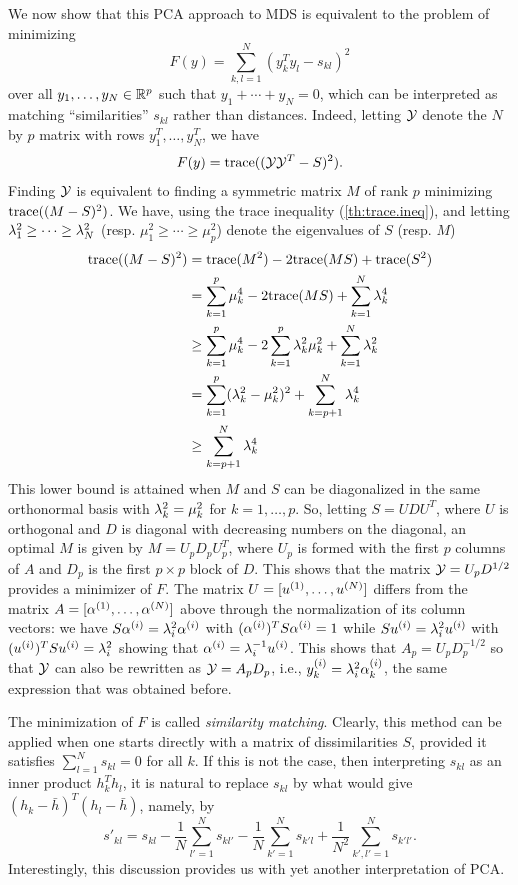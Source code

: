 We now show that this PCA approach to MDS is equivalent to the problem of minimizing
\begin{equation}
\label{eq:sim.match}
F(y) = \sum_{k,l=1}^N (y_k^Ty_l - s_{kl})^2 
\end{equation}
over all $y_1, \ldots, y_N\in {\mathbb{R}}^p$ such that $y_1 + \cdots + y_N = 0$, 
which can be interpreted as matching ``similarities'' $s_{kl}$ rather than distances. Indeed, letting ${\mathcal Y}$ denote the $N$ by $p$ matrix with rows $y_1^T, \ldots, y_N^T$, we have
\[
F(y) = {\mathrm{trace}}( ({\mathcal Y}{\mathcal Y}^T - S)^2).
\]
Finding ${\mathcal Y}$ is equivalent to finding a symmetric matrix $M$ of rank $p$ minimizing ${\mathrm{trace}}((M-S)^2)$.
 We have, using the trace inequality (\cref{th:trace.ineq}), and letting $\lambda_1^2 \geq \cdots \geq \lambda_N^2$  (resp. $\mu_1^2 \geq \cdots \geq \mu_p^2$) denote the eigenvalues of $S$ (resp. $M$)
\begin{align*}
{\mathrm{trace}}((M-S)^2) & = {\mathrm{trace}}(M^2) - 2{\mathrm{trace}}(MS) + {\mathrm{trace}}(S^2) \\
&= \sum_{k=1}^p \mu_k^4 - 2{\mathrm{trace}}(MS) + \sum_{k=1}^N \lambda_k^4\\
&\geq \sum_{k=1}^p \mu_k^4 - 2\sum_{k=1}^p \lambda^2_k\mu^2_k + \sum_{k=1}^N \lambda_k^2\\
&= \sum_{k=1}^p (\lambda^2_k-\mu^2_k)^2 + \sum_{k=p+1}^N \lambda_k^4\\
&\geq  \sum_{k=p+1}^N \lambda_k^4
\end{align*}
This lower bound is attained when $M$ and $S$ can be diagonalized in the same orthonormal basis with $\lambda^2_k=\mu^2_k$ for $k=1, \ldots, p$. So, letting $S = UDU^T$, where $U$ is orthogonal and $D$ is diagonal with decreasing numbers on the diagonal, an optimal $M$ is given by $M = U_p D_p U_p^T$, where $U_p$ is formed with the first $p$ columns of $A$ and $D_p$ is the first $p\times p$ block of $D$. This shows that the matrix ${\mathcal Y} = U_p D^{1/2}$ provides a minimizer of $F$.
The matrix $U = [u^{(1)}, \ldots, u^{(N)}]$ differs from the matrix $A = [\alpha^{(1)}, \ldots, \alpha^{(N)}]$ above through the normalization of its column vectors: we have $S\alpha^{(i)} = \lambda^2_i \alpha^{(i)}$ with $(\alpha^{(i)})^T S \alpha^{(i)} = 1$ while $Su^{(i)} = \lambda^2_i u^{(i)}$ with $(u^{(i)})^T S u^{(i)} = \lambda^2_i$ showing that $\alpha^{(i)} = \lambda_i^{-1} u^{(i)}$. This shows that $A_p = U_p D_p^{-1/2}$ so that ${\mathcal Y}$ can also be rewritten as ${\mathcal Y} = A_p D_p$, i.e., $y_{k}^{(i)} =  \lambda_i^2 \alpha_{k}^{(i)}$, the same expression that was obtained before.

The minimization of $F$ is called {\em similarity matching}. Clearly, this method can be applied when one starts directly with a matrix of dissimilarities $S$, provided it satisfies $\sum_{l=1}^N s_{kl}=0$ for all $k$. If this is not the case, then interpreting $s_{kl}$ as an inner product $h_k^Th_l$, it is natural to replace $s_{kl}$ by what would give $(h_k - \bar h)^T(h_l - \bar h)$, namely, by 
\[
s'_{kl} = s_{kl} - \frac1N \sum_{l'=1}^N s_{kl'} - \frac1N \sum_{ k'=1}^N s_{k' l} + \frac1{N^2} \sum_{k', l'=1}^N s_{k'l'}.
\]  
Interestingly, this discussion provides us with yet another interpretation of PCA.

